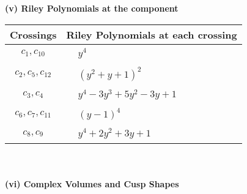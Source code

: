 \documentclass[1p]{elsarticle_modified}
\theoremstyle{definition}
\begin{document}
\newpage\renewcommand{\arraystretch}{1}
\flushleft \textbf{(v) Riley Polynomials at the component}\newline \\
\begin{tabular}{m{50pt}|m{274pt}}
Crossings & \hspace{64pt}Riley Polynomials at each crossing \\
\hline $$\begin{aligned}c_{1},c_{10}\end{aligned}$$&$\begin{aligned}
&y^4
\end{aligned}$\\
\hline $$\begin{aligned}c_{2},c_{5},c_{12}\end{aligned}$$&$\begin{aligned}
&(y^2+y+1)^2
\end{aligned}$\\
\hline $$\begin{aligned}c_{3},c_{4}\end{aligned}$$&$\begin{aligned}
&y^4-3 y^3+5 y^2-3 y+1
\end{aligned}$\\
\hline $$\begin{aligned}c_{6},c_{7},c_{11}\end{aligned}$$&$\begin{aligned}
&(y-1)^4
\end{aligned}$\\
\hline $$\begin{aligned}c_{8},c_{9}\end{aligned}$$&$\begin{aligned}
&y^4+2 y^2+3 y+1
\end{aligned}$\\
\hline
\end{tabular}\\~\\
\newpage\flushleft \textbf{(vi) Complex Volumes and Cusp Shapes}
\end{document}
